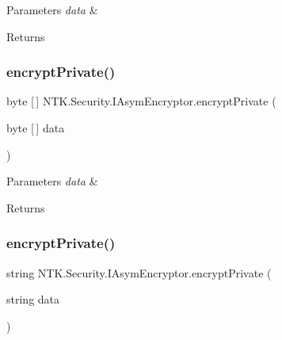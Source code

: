 \begin{DoxyParams}{Parameters}
{\em data} & \\
\hline
\end{DoxyParams}
\begin{DoxyReturn}{Returns}

\end{DoxyReturn}
\mbox{\label{interface_n_t_k_1_1_security_1_1_i_asym_encryptor_af0ffc13eb521efbaad8f87e90469fb28}} 
\subsubsection{\texorpdfstring{encryptPrivate()}{encryptPrivate()}\hspace{0.1cm}{\footnotesize\ttfamily [1/2]}}
{\footnotesize\ttfamily byte \mbox{[}$\,$\mbox{]} N\+T\+K.\+Security.\+I\+Asym\+Encryptor.\+encrypt\+Private (\begin{DoxyParamCaption}\item[{byte \mbox{[}$\,$\mbox{]}}]{data }\end{DoxyParamCaption})}






\begin{DoxyParams}{Parameters}
{\em data} & \\
\hline
\end{DoxyParams}
\begin{DoxyReturn}{Returns}

\end{DoxyReturn}
\mbox{\label{interface_n_t_k_1_1_security_1_1_i_asym_encryptor_a35f7b4196ebc0601978db516da7a2e0b}} 
\subsubsection{\texorpdfstring{encryptPrivate()}{encryptPrivate()}\hspace{0.1cm}{\footnotesize\ttfamily [2/2]}}
{\footnotesize\ttfamily string N\+T\+K.\+Security.\+I\+Asym\+Encryptor.\+encrypt\+Private (\begin{DoxyParamCaption}\item[{string}]{data }\end{DoxyParamCaption})}






